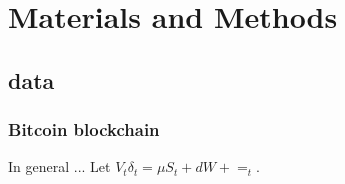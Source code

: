 

\chapter{ Materials and Methods } \label{chapter-mm}

\minitoc

\section{data}

\subsection{Bitcoin blockchain}


In general ... Let $V_{t} \delta_{t} = \mu S_{t} + dW+=_{t}$.
